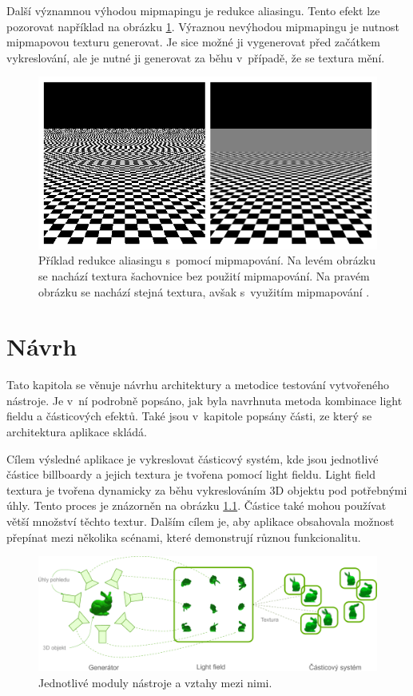 Další významnou výhodou mipmapingu je redukce aliasingu. Tento efekt lze pozorovat například na obrázku \ref{fig:mipmap_alias}. Výraznou nevýhodou mipmapingu je nutnost mipmapovou texturu generovat. Je sice možné ji vygenerovat před začátkem vykreslování, ale je nutné ji generovat za běhu v~případě, že se textura mění. 

\begin{figure}[H]
	\centering
		\includegraphics[width=1.0\textwidth]{obrazky-figures/mipmap1.png}
	\caption{Příklad redukce aliasingu s~pomocí mipmapování. Na levém obrázku se nachází textura šachovnice bez použití mipmapování. Na pravém obrázku se nachází stejná textura, avšak s~využitím mipmapování \protect\footnotemark.}
	\label{fig:mipmap_alias}
\end{figure}

\chapter{Návrh}
Tato kapitola se věnuje návrhu architektury a metodice testování vytvořeného nástroje. Je v~ní podrobně popsáno, jak byla navrhnuta metoda kombinace light fieldu a částicových efektů. Také jsou v~kapitole popsány části, ze který se architektura aplikace skládá.

Cílem výsledné aplikace je vykreslovat částicový systém, kde jsou jednotlivé částice billboardy a jejich textura je tvořena pomocí light fieldu. Light field textura je tvořena dynamicky za běhu vykreslováním 3D objektu pod potřebnými úhly. Tento proces je znázorněn na obrázku \ref{fig:navrh_bp}. Částice také mohou používat větší množství těchto textur. Dalším cílem je, aby aplikace obsahovala možnost přepínat mezi několika scénami, které demonstrují různou funkcionalitu.

\begin{figure}[H]
	\centering
		\includegraphics[width=1.0\textwidth]{obrazky-figures/bpnavrh.pdf}
	\caption{Jednotlivé moduly nástroje a vztahy mezi nimi.}
	\label{fig:navrh_bp}
\end{figure}

